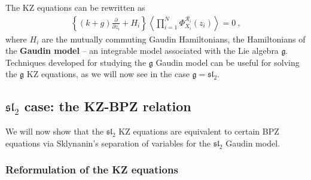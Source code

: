 \documentclass[12pt, a4paper, notitlepage, twoside]{report}
\numberwithin{equation}{section}
\theoremstyle{break}
\begin{document}
The KZ equations can be rewritten as 
\begin{align}
 \left\{(k+g){\frac{\partial}{\partial z_i}} + H_i \right\}\left\langle \prod_{i=1}^N \Phi^{\mathcal{R}_i}_{X_i}(z_i)\right\rangle   = 0 \ ,
\label{phz}
\end{align}
where $H_i$ are the mutually commuting Gaudin Hamiltonians, the Hamiltonians of the \textbf{\boldmath Gaudin model} -- an integrable model associated with the Lie algebra $\mathfrak{g}$.
Techniques developed for studying the $\mathfrak{g}$ Gaudin model can be useful for solving the $\mathfrak{g}$ KZ equations, as we will now see in the case $\mathfrak{g} = \mathfrak{sl}_2$. 


\subsection{\texorpdfstring{$\mathfrak{sl}_2$}{sl2} case: the KZ-BPZ relation} \label{seckzbpz}

We will now show that the $\mathfrak{sl}_2$ KZ equations are equivalent to certain BPZ equations via Sklynanin's separation of variables for the $\mathfrak{sl}_2$ Gaudin model. 

\subsubsection{Reformulation of the KZ equations}
\end{document}
